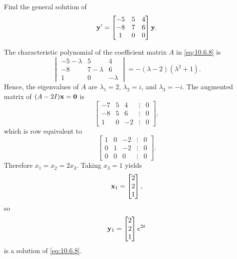 \documentclass{ximera}
\begin{document}
\begin{example}\label{example:10.6.3}
 Find the general solution of
\begin{equation} \label{eq:10.6.8}
{\bf y}'=\begin{bmatrix}-5&5&4\\-8&7&6\\1&0&0\end{bmatrix}{\bf y}.
\end{equation}

\begin{explanation} 
The characteristic
polynomial of the  coefficient matrix $A$ in  \eqref{eq:10.6.8} is
$$
\begin{vmatrix}-5-\lambda&5&4\\-8&7-\lambda&
6\\ 1
&0&-\lambda\end{vmatrix}=-(\lambda-2)(\lambda^2+1).
$$
Hence, the eigenvalues of $A$ are $\lambda_1=2$, $\lambda_2=i$, and
$\lambda_3=-i$.
The augmented matrix of $(A-2I){\bf x=0}$ is
$$
\begin{bmatrix}-7&5&4&\vdots&0\\-8&
5&6&\vdots&0\\ 1&0&-2&\vdots&0
\end{bmatrix},
$$
which is row equivalent to
$$
\begin{bmatrix} 1&0&-2&\vdots&0\\ 0&1&-2&
\vdots&0\\ 0&0&0&\vdots&0\end{bmatrix}.
$$
Therefore $x_1=x_2=2x_3$.  Taking $x_3=1$ yields
$$
{\bf x}_1=\begin{bmatrix}2\\2\\1\end{bmatrix},
$$
so
$$
{\bf y}_1=\begin{bmatrix}2\\2\\1\end{bmatrix}e^{2t}
$$
is a solution of  \eqref{eq:10.6.8}.


\end{explanation}
\end{example}
\end{document}
